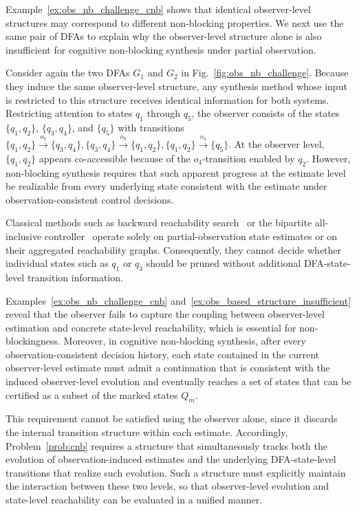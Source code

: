 \documentclass[final,5p,times,twocolumn,authoryear]{elsarticle}
\begin{document}
Example~\ref{ex:obs_nb_challenge_cnb} shows that identical observer-level structures may correspond to different non-blocking properties.
We next use the same pair of DFAs to explain why the observer-level structure alone is also insufficient for cognitive non-blocking synthesis under partial observation.

\begin{example}\label{ex:obs_based_structure_insufficient}
Consider again the two DFAs $G_1$ and $G_2$ in Fig.~\ref{fig:obs_nb_challenge}.
Because they induce the same observer-level structure, any synthesis method whose input is restricted to this structure receives identical information for both systems.
%
Restricting attention to states $q_1$ through $q_5$, the observer consists of the states $\{q_1, q_2\}$, $\{q_3, q_4\}$, and $\{q_5\}$ with transitions
$
\{q_1,q_2\} \xrightarrow{o_2} \{q_3,q_4\},
\{q_3,q_4\} \xrightarrow{o_3} \{q_1,q_2\},
\{q_1,q_2\} \xrightarrow{o_4} \{q_5\}.
$
At the observer level, $\{q_1, q_2\}$ appears co-accessible because of the $o_4$-transition enabled by $q_2$.
However, non-blocking synthesis requires that such apparent progress at the estimate level be realizable from every underlying state consistent with the estimate under observation-consistent control decisions.

Classical methods such as backward reachability search~\cite{thuijsman2020transformational,thuijsman2024reducing} or the bipartite all-inclusive controller~\cite{yin2016synthesis} operate solely on partial-observation state estimates or on their aggregated reachability graphs.
%
Consequently, they cannot decide whether individual states such as $q_1$ or $q_3$ should be pruned without additional DFA-state-level transition information.

\end{example}

Examples~\ref{ex:obs_nb_challenge_cnb} and~\ref{ex:obs_based_structure_insufficient} reveal that the observer fails to capture the coupling between observer-level estimation and concrete state-level reachability, which is essential for non-blockingness.
%
Moreover, in cognitive non-blocking synthesis, after every observation-consistent decision history, each state contained in the current observer-level estimate must admit a continuation that is consistent with the induced observer-level evolution and eventually reaches a set of states that can be certified as a subset of the marked states $Q_m$.

This requirement cannot be satisfied using the observer alone, since it discards the internal transition structure within each estimate.
%
Accordingly, Problem~\ref{prob:cnb} requires a structure that simultaneously tracks both the evolution of observation-induced estimates and the underlying DFA-state-level transitions that realize such evolution.
%
Such a structure must explicitly maintain the interaction between these two levels, so that observer-level evolution and state-level reachability can be evaluated in a unified manner.
\end{document}
